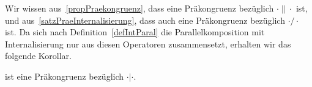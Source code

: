 Wir wissen aus~\ref{propPraekongruenz}, dass \ERel{} eine Präkongruenz
bezüglich $\cdot\|\cdot$ ist, und aus~\ref{satzPraeInternalisierung}, dass
\ERel{} auch eine Präkongruenz bezüglich $\cdot/\cdot$ ist. Da sich nach
Definition~\ref{defIntParal} die Parallelkomposition mit Internalisierung nur
aus diesen Operatoren zusammensetzt, erhalten wir das folgende Korollar.

\begin{kor}
  \ERel{} ist eine Präkongruenz bezüglich $\cdot|\cdot$.
\end{kor}
